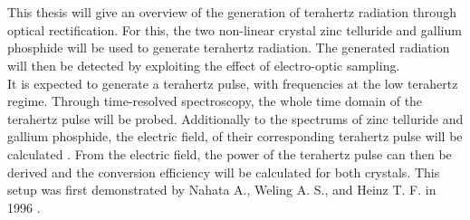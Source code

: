 \\\\
This thesis will give an overview of the generation of terahertz radiation through optical rectification.
For this, the two non-linear crystal zinc telluride and gallium phosphide will be used to generate terahertz radiation.
The generated radiation will then be detected by exploiting the effect of electro-optic sampling.
\\
It is expected to generate a terahertz pulse, with frequencies at the low terahertz regime.
Through time-resolved spectroscopy, the whole time domain of the terahertz pulse will be probed.
Additionally to the spectrums of zinc telluride and gallium phosphide, the electric field, of their corresponding terahertz pulse will be calculated \cite{THZ_eltric_field}.
From the electric field, the power of the terahertz pulse can then be derived and the conversion efficiency will be calculated for both crystals.
This setup was first demonstrated by Nahata A., Weling A. S., and Heinz T. F. in 1996 \cite{ZnTe_Nahata_Weling_1996}.





